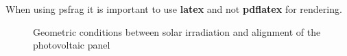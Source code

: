 When using psfrag it is important to use \textbf{latex} and not \textbf{pdflatex} for rendering.

\begin{figure}[htb]
	\centering
	\hspace{1cm}
	\caption[Geometric conditions between solar irradiation and alignment of the photovoltaic panel]{Geometric conditions between solar irradiation and alignment of the photovoltaic panel \cite{masters04}}
	\label{fig:collector}
\end{figure}
